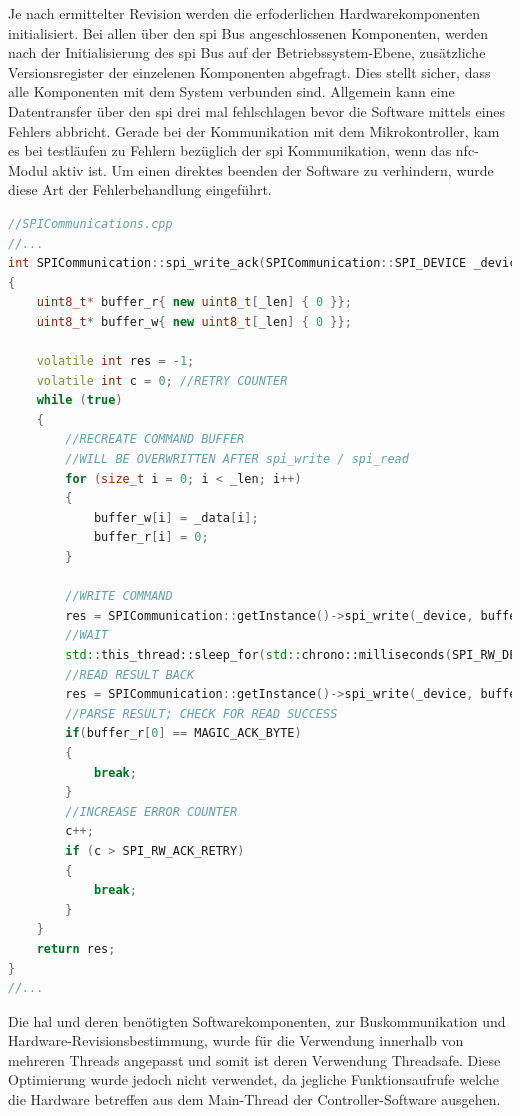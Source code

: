 Je nach ermittelter Revision werden die erfoderlichen
Hardwarekomponenten initialisiert. Bei allen über den \gls{spi} Bus
angeschlossenen Komponenten, werden nach der Initialisierung des
\gls{spi} Bus auf der Betriebssystem-Ebene, zusätzliche Versionsregister
der einzelenen Komponenten abgefragt. Dies stellt sicher, dass alle
Komponenten mit dem System verbunden sind. Allgemein kann eine
Datentransfer über den \gls{spi} drei mal fehlschlagen bevor die
Software mittels eines Fehlers abbricht. Gerade bei der Kommunikation
mit dem Mikrokontroller, kam es bei testläufen zu Fehlern bezüglich der
\gls{spi} Kommunikation, wenn das \gls{nfc}-Modul aktiv ist. Um einen
direktes beenden der Software zu verhindern, wurde diese Art der
Fehlerbehandlung eingeführt.

\begin{lstlisting}[language={C++}]
//SPICommunications.cpp
//...
int SPICommunication::spi_write_ack(SPICommunication::SPI_DEVICE _device, uint8_t* _data, int _len)
{
    uint8_t* buffer_r{ new uint8_t[_len] { 0 }};
    uint8_t* buffer_w{ new uint8_t[_len] { 0 }};

    volatile int res = -1;
    volatile int c = 0; //RETRY COUNTER
    while (true)
    {
        //RECREATE COMMAND BUFFER
        //WILL BE OVERWRITTEN AFTER spi_write / spi_read
        for (size_t i = 0; i < _len; i++)
        {
            buffer_w[i] = _data[i];
            buffer_r[i] = 0;
        }
        
        //WRITE COMMAND
        res = SPICommunication::getInstance()->spi_write(_device, buffer_w, _len);
        //WAIT
        std::this_thread::sleep_for(std::chrono::milliseconds(SPI_RW_DELAY));
        //READ RESULT BACK
        res = SPICommunication::getInstance()->spi_write(_device, buffer_r, _len);
        //PARSE RESULT; CHECK FOR READ SUCCESS
        if(buffer_r[0] == MAGIC_ACK_BYTE)
        {
            break;
        }
        //INCREASE ERROR COUNTER
        c++;
        if (c > SPI_RW_ACK_RETRY)
        {
            break;
        }
    }
    return res;
}
//...
\end{lstlisting}

Die \gls{hal} und deren benötigten Softwarekomponenten, zur
Buskommunikation und Hardware-Revisionsbestimmung, wurde für die
Verwendung innerhalb von mehreren Threads angepasst und somit ist deren
Verwendung Threadsafe. Diese Optimierung wurde jedoch nicht verwendet,
da jegliche Funktionsaufrufe welche die Hardware betreffen aus dem
Main-Thread der Controller-Software ausgehen.

